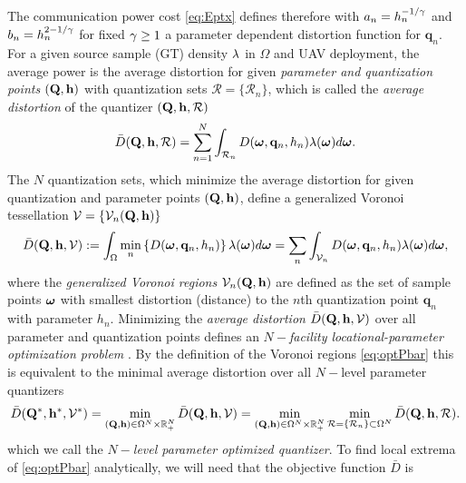 \documentclass[smallabstract,smallcaptions]{dccpaper}
\renewcommand{\vp}{\mathbf q}
\renewcommand{\vP}{\mathbf Q}
\newcommand{\df}{\ensuremath{\lam}}         %
\newcommand{\bH}{\ensuremath{\vh}}          %
\newcommand{\Vor}{\ensuremath{\mathcal{V}}}         %
\newcommand{\Rset}{\ensuremath{\mathcal R}}
\newcommand{\Dis}{\ensuremath{D}}                    %
\newcommand{\AvDis}{\ensuremath{\bar{\Dis}}}         %
\begin{document}
The communication power cost \eqref{eq:Eptx} defines therefore with $a_n=h_n^{-1/\gamma}$ and $b_n=h_n^{2-1/\gamma}$ for
fixed $\gamma\geq 1$ a parameter dependent distortion function for $\vp_n$. For a given source sample (GT)
density $\df$ in $\Omega$ and UAV deployment, the average power is the average distortion for 
given \emph{parameter and quantization points}
$(\vP,\vh)$ with quantization sets $\Rset=\{\Rset_n\}$, which is called the \emph{average distortion} of the quantizer
$(\vP,\vh,\Rset)$
%
\begin{equation}
 \AvDis(\vP,\vh,\Rset)
  = \sum_{n=1}^N \int_{\Rset_n} D(\vome,\vp_n,h_n)\lam(\vome)d\vome.
  \label{eq:Pbar}
\end{equation}
%
The $N$ quantization sets, which minimize the average distortion for 
given quantization and parameter points $(\vP,\vh)$, define a generalized Voronoi tessellation $\Vor=\{\Vor_n(\vP,\vh)\}$
%
\begin{align}
  \AvDis(\vP,\vh,\Vor)
  :=\int_{\Omega}\min_{n} \left\{ \Dis(\vome,\vp_n,h_n) \right\} \df(\vome)d\vome 
  =\sum_n\int_{\Vor_n}\Dis(\vome,\vp_n,h_n) \df(\vome)d\vome 
  \label{eq:optPbar},
\end{align}
%
where the \emph{generalized Voronoi regions} $\Vor_n(\vP,\vh)$ are defined as the set of sample points $\boldsymbol{ \omega}$
with smallest distortion (distance) to the $n$th quantization point $\vp_n$ with parameter $h_n$.  Minimizing the \emph{average distortion}
$\AvDis(\vP,\vh,\Vor)$ over all parameter and quantization points defines an \emph{$N-$facility locational-parameter
optimization problem} \cite{GJ, GJcom18, GJ18,OBSC00}. By the definition of the Voronoi regions \eqref{eq:optPbar} this is
equivalent to the minimal average distortion over all $N-$level parameter quantizers%
\begin{align}
  \AvDis(\vP^*,\vh^*,\Vor^*)
  = \min_{(\vP,\vh)\in\Ome^N\times\R_+^N} \AvDis(\vP,\vh,\Vor)
  = \min_{(\vP,\vh)\in\Ome^N\times\R_+^N} \min_{\Rset=\{\Rset_n\}\subset\Ome^N} \AvDis(\vP,\vh,\Rset) 
.\label{eq:optquanteqoptdeploy}
\end{align}
which we call the \emph{$N-$level parameter optimized quantizer}. %
%
%
%
To find local extrema of \eqref{eq:optPbar} analytically, we will need that the objective function $\AvDis$ is
\end{document}
